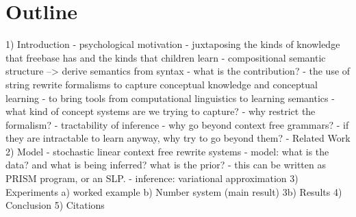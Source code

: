 \documentclass{article}
\begin{document}
\section{Outline}
1) Introduction
  - psychological motivation 
    - juxtaposing the kinds of knowledge that freebase has and the kinds that children learn
    - compositional semantic structure --> derive semantics from syntax
  - what is the contribution?
     - the use of string rewrite formalisms to capture conceptual knowledge and conceptual learning
     - to bring tools from computational linguistics to learning semantics
  - what kind of concept systems are we trying to capture?
  - why restrict the formalism? 
     - tractability of inference 
  - why go beyond context free grammars? 
     - if they are intractable to learn anyway, why try to go beyond them? 
  - Related Work
2) Model
- stochastic linear context free rewrite systems
  - model: what is the data? and what is being inferred? what is the prior? 
  - this can be written as PRISM program, or an SLP. 
  - inference: variational approximation 
3) Experiments
  a) worked example
  b) Number system (main result)
  3b) Results
4) Conclusion
5) Citations
\end{document}
